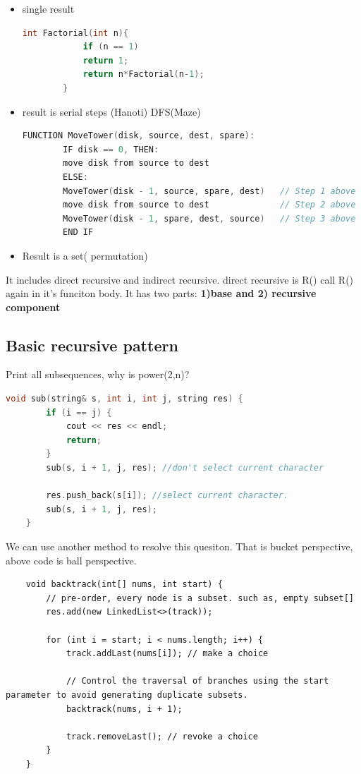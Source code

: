 \documentclass[a4paper,11pt,twoside]{book}
\begin{document}
\begin{itemize}
	\item single result 
	\begin{lstlisting}[frame=single, language=c++]
		int Factorial(int n){
			if (n == 1) 
			return 1;
			return n*Factorial(n-1);
		}
	\end{lstlisting}
	
	\item result is serial steps (Hanoti) DFS(Maze)
	\begin{lstlisting}[frame=single, language=c++]
		FUNCTION MoveTower(disk, source, dest, spare):
		IF disk == 0, THEN:
		move disk from source to dest
		ELSE:
		MoveTower(disk - 1, source, spare, dest)   // Step 1 above
		move disk from source to dest              // Step 2 above
		MoveTower(disk - 1, spare, dest, source)   // Step 3 above
		END IF
	\end{lstlisting}
	
	\item  Result is a set( permutation)
	
\end{itemize}

\par It includes direct recursive and indirect recursive. direct recursive is R() call R() again in it's funciton body. It has two parts: \textbf{1)base and 2) recursive component}



\subsection{Basic recursive pattern}



\par Print all subsequences, why is power(2,n)?

\begin{lstlisting}[frame=single, language=c++]
	void sub(string& s, int i, int j, string res) {
		if (i == j) {
			cout << res << endl;
			return;
		}
		sub(s, i + 1, j, res); //don't select current character
		
		res.push_back(s[i]); //select current character.
		sub(s, i + 1, j, res);
	}	
\end{lstlisting}	

\par We can use another method to resolve this quesiton. That is bucket perspective, above code is ball perspective. 

\begin{lstlisting}
	void backtrack(int[] nums, int start) {	
		// pre-order, every node is a subset. such as, empty subset[]
		res.add(new LinkedList<>(track));
		
		for (int i = start; i < nums.length; i++) {
			track.addLast(nums[i]); // make a choice
			
			// Control the traversal of branches using the start parameter to avoid generating duplicate subsets.
			backtrack(nums, i + 1);
			
			track.removeLast(); // revoke a choice
		}
	}
\end{lstlisting}
\end{document}
